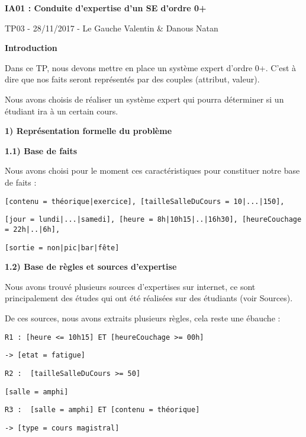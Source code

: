 \documentclass[a4paper]{article}
\begin{document}
\begin{center}
{\Large {\bfseries IA01 : Conduite d'expertise d'un SE d'ordre 0+}}

{\large TP03 - 28/11/2017 - Le Gauche Valentin \& Danous Natan }
\end{center}

\medskip

{\large{\bfseries Introduction}}

Dans ce TP, nous devons mettre en place un système expert d'ordre 0+. C'est à dire que nos faits seront représentés par des couples (attribut, valeur).

Nous avons choisis de réaliser un système expert qui pourra déterminer si un étudiant ira à un certain cours.

\medskip

{\large{\bfseries 1) Représentation formelle du problème}}

\smallskip

{\bfseries 1.1) Base de faits}

\smallskip

Nous avons choisi pour le moment ces caractéristiques pour constituer notre base de faits :

\verb+[contenu = théorique|exercice], [tailleSalleDuCours = 10|...|150],+ 

\verb+[jour = lundi|...|samedi], [heure = 8h|10h15|..|16h30], [heureCouchage = 22h|..|6h],+

\verb+[sortie = non|pic|bar|fête]+

\smallskip

{\bfseries 1.2) Base de règles et sources d'expertise}

\smallskip

Nous avons trouvé plusieurs sources d'expertises sur internet, ce sont principalement des études qui ont été réalisées sur des étudiants (voir Sources).

De ces sources, nous avons extraits plusieurs règles, cela reste une ébauche :

\verb+R1 : [heure <= 10h15] ET [heureCouchage >= 00h]+
	
\hspace{4ex}\verb+-> [etat = fatigue]+

\verb+R2 :	[tailleSalleDuCours >= 50]+
	
\hspace{4ex}\verb+[salle = amphi]+

\verb+R3 :	[salle = amphi] ET [contenu = théorique]+
	
\hspace{4ex}\verb+-> [type = cours magistral]+
\end{document}
